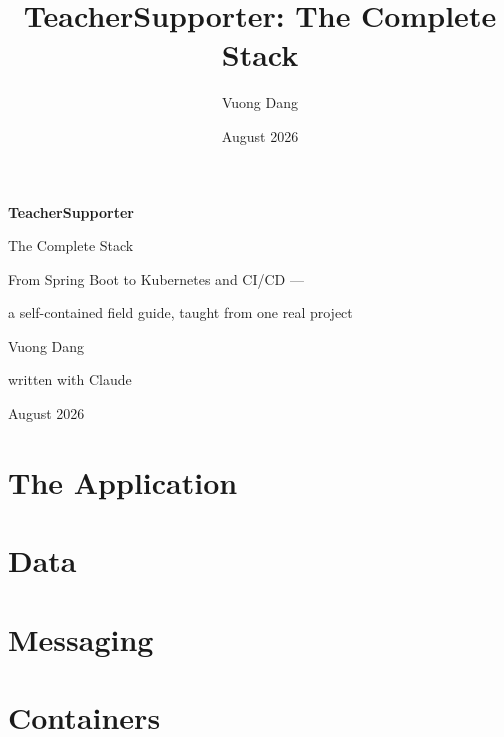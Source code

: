 \documentclass[11pt,twoside,openany]{book}
\title{TeacherSupporter: The Complete Stack}
\author{Vuong Dang}
\date{August 2026}
\begin{document}
\frontmatter

\begin{titlepage}
  \centering
  \vspace*{1.6in}
  {\Huge\bfseries TeacherSupporter\par}
  \vspace{0.15in}
  {\LARGE The Complete Stack\par}
  \vspace{0.35in}
  {\large From Spring Boot to Kubernetes and CI/CD ---\par
   a self-contained field guide, taught from one real project\par}
  \vspace{1.2in}
  {\large Vuong Dang\par}
  \vspace{0.1in}
  {\normalsize written with Claude\par}
  \vfill
  {\small August 2026 \par}
\end{titlepage}




\tableofcontents

\mainmatter

\part{The Application}







\part{Data}




\part{Messaging}



\part{Containers}


\end{document}
